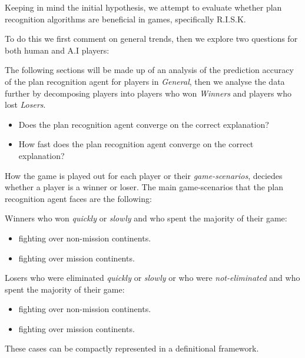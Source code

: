 \documentclass[parskip]{cs4rep}
\begin{document}
Keeping in mind the initial hypothesis, we attempt to evaluate whether plan recognition algorithms are beneficial in games, specifically R.I.S.K.

To do this we first comment on general trends, then we explore two questions for both human and A.I players:

The following sections will be made up of an analysis of the prediction accuracy of the plan recognition agent for players in \textit{General}, then we analyse the data further by decomposing players into players who won \textit{Winners} and players who lost \textit{Losers}.

\begin{itemize}
\item
Does the plan recognition agent converge on the correct explanation?
\item
How fast does the plan recognition agent converge on the correct explanation?
\end{itemize}

How the game is played out for each player or their \textit{game-scenarios}, deciedes whether a player is a winner or loser.  The main game-scenarios that the plan recognition agent faces are the following:

Winners who won \textit{quickly} or \textit{slowly} and who spent the majority of their game:

\begin{itemize}
\item
fighting over non-mission continents.
\item
fighting over mission continents.
\end{itemize}

Losers who were eliminated \textit{quickly} or \textit{slowly} or who were \textit{not-eliminated} and who spent the majority of their game:

\begin{itemize}
\item
fighting over non-mission continents.
\item
fighting over mission continents.
\end{itemize}

These cases can be compactly represented in a definitional framework.
\end{document}
